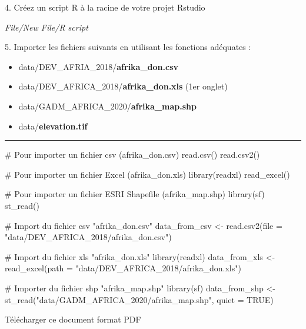 \documentclass[
  letterpaper,
  DIV=11,
  numbers=noendperiod]{scrartcl}
\newenvironment{Shaded}{\begin{snugshade}}{\end{snugshade}}
\newcommand{\AttributeTok}[1]{\textcolor[rgb]{0.40,0.45,0.13}{#1}}
\newcommand{\CommentTok}[1]{\textcolor[rgb]{0.37,0.37,0.37}{#1}}
\newcommand{\ConstantTok}[1]{\textcolor[rgb]{0.56,0.35,0.01}{#1}}
\newcommand{\FunctionTok}[1]{\textcolor[rgb]{0.28,0.35,0.67}{#1}}
\newcommand{\NormalTok}[1]{\textcolor[rgb]{0.00,0.23,0.31}{#1}}
\newcommand{\OtherTok}[1]{\textcolor[rgb]{0.00,0.23,0.31}{#1}}
\newcommand{\StringTok}[1]{\textcolor[rgb]{0.13,0.47,0.30}{#1}}
\providecommand{\tightlist}{%
  \setlength{\itemsep}{0pt}\setlength{\parskip}{0pt}}\usepackage{longtable,booktabs,array}
\begin{document}
{4. Créez un script R à la racine de votre projet Rstudio}

\emph{File/New File/R script}

{5. Importer les fichiers suivants en utilisant les fonctions adéquates
:}

\begin{itemize}
\tightlist
\item
  data/DEV\_AFRIA\_2018/\textbf{afrika\_don.csv}\\
\item
  data/DEV\_AFRICA\_2018/\textbf{afrika\_don.xls} (1er onglet)\\
\item
  data/GADM\_AFRICA\_2020/\textbf{afrika\_map.shp}\\
\item
  data/\textbf{elevation.tif}
\end{itemize}

\begin{center}\rule{0.5\linewidth}{0.5pt}\end{center}

\begin{Shaded}
\begin{Highlighting}[]
\CommentTok{\# Pour importer un fichier csv (afrika\_don.csv)}
\FunctionTok{read.csv}\NormalTok{()}
\FunctionTok{read.csv2}\NormalTok{()}

\CommentTok{\# Pour importer un fichier Excel (afrika\_don.xls)}
\FunctionTok{library}\NormalTok{(readxl)}
\FunctionTok{read\_excel}\NormalTok{()}

\CommentTok{\# Pour importer un fichier ESRI Shapefile (afrika\_map.shp)}
\FunctionTok{library}\NormalTok{(sf)}
\FunctionTok{st\_read}\NormalTok{()}
\end{Highlighting}
\end{Shaded}

\begin{Shaded}
\begin{Highlighting}[]
\CommentTok{\# Import du fichier csv "afrika\_don.csv"}
\NormalTok{data\_from\_csv }\OtherTok{\textless{}{-}} \FunctionTok{read.csv2}\NormalTok{(}\AttributeTok{file =} \StringTok{"data/DEV\_AFRICA\_2018/afrika\_don.csv"}\NormalTok{)}

\CommentTok{\# Import du fichier xls "afrika\_don.xls"}
\FunctionTok{library}\NormalTok{(readxl)}
\NormalTok{data\_from\_xls }\OtherTok{\textless{}{-}} \FunctionTok{read\_excel}\NormalTok{(}\AttributeTok{path =} \StringTok{"data/DEV\_AFRICA\_2018/afrika\_don.xls"}\NormalTok{)}

\CommentTok{\# Importer du fichier shp "afrika\_map.shp"}
\FunctionTok{library}\NormalTok{(sf)}
\NormalTok{data\_from\_shp }\OtherTok{\textless{}{-}} \FunctionTok{st\_read}\NormalTok{(}\StringTok{"data/GADM\_AFRICA\_2020/afrika\_map.shp"}\NormalTok{,  }\AttributeTok{quiet =} \ConstantTok{TRUE}\NormalTok{)}
\end{Highlighting}
\end{Shaded}

\hfill\break
\hfill\break

Télécharger ce document format PDF
\end{document}
